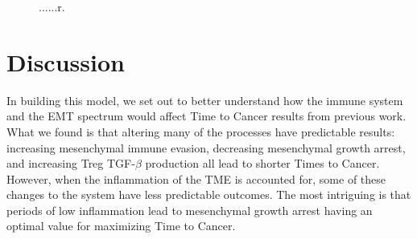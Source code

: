 \documentclass[11pt, a4paper, preprint]{article}
\begin{document}
\begin{figure}[H]
\center
{}
\caption{......r.}
\label{fig:tcga}
\end{figure}




\section{Discussion}\label{Discussion}
In building this model, we set out to better understand how the immune system and the EMT spectrum would affect Time to Cancer results from previous work.
What we found is that altering many of the processes have predictable results: increasing mesenchymal immune evasion, decreasing mesenchymal growth arrest, and increasing Treg TGF-$\beta$ production all lead to shorter Times to Cancer.
However, when the inflammation of the TME is accounted for, some of these changes to the system have less predictable outcomes.
The most intriguing is that periods of low inflammation lead to mesenchymal growth arrest having an optimal value for maximizing Time to Cancer.



\end{document}
